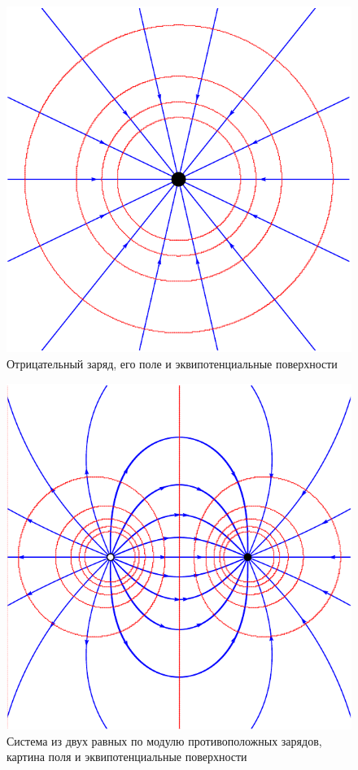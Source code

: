 		\begin{figure}[h!]
			\centering
			\includegraphics[scale=0.75]{./img/fig15/fig15.pdf}
			\caption{Отрицательный заряд, его поле и эквипотенциальные поверхности}
			\end{figure}
		\begin{figure}[h!]
			\centering
			\includegraphics[scale=0.75]{./img/fig16/fig16.pdf}
			\caption{Система из двух равных по модулю противоположных зарядов, картина поля и эквипотенциальные поверхности}
		\end{figure}
